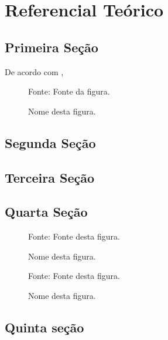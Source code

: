 \chapter{Referencial Teórico}

\section{Primeira Seção}

De acordo com , \lipsum[1-4]

	\begin{figure}[!ht]
		\centering
		\caption{Nome desta figura.}
		\fbox{\rule[5cm]{\textwidth}{0cm}}
		\begin{minipage}{\textwidth}
			\centering
			{\small Fonte: Fonte da figura.}\par
		\end{minipage}
		\label{fig:irradiacao}
	\end{figure}
	
\section{Segunda Seção}
\lipsum[5-8]

\section{Terceira Seção}
\lipsum[9-10]
	
\section{Quarta Seção}
\lipsum[11]
	
	\begin{figure}[!ht]
		\centering
		\caption{Nome desta figura.}
		\fbox{\rule[6cm]{\textwidth}{0cm}}
		\begin{minipage}{\textwidth}
			\centering
			{\small Fonte: Fonte desta figura.}\par
		\end{minipage}
		\label{fig:aquecedor1}
	\end{figure}
	
\lipsum[12]
	
	\begin{figure}[!ht]
		\centering
		\caption{Nome desta figura.}
		\fbox{\rule[5cm]{\textwidth}{0cm}}
		\begin{minipage}{\textwidth}
			\centering
			{\small Fonte: Fonte desta figura.}\par
		\end{minipage}
		\label{fig:aquecedor2}
	\end{figure}
	
\lipsum[13]
	
\section{Quinta seção}
\lipsum[14-17]
